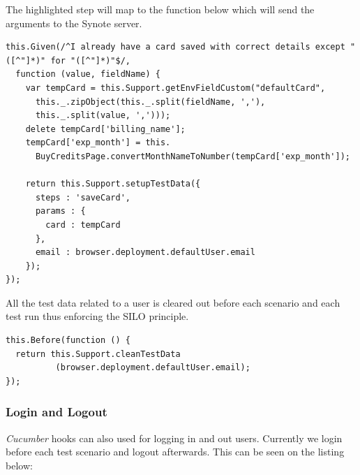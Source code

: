 The highlighted step will map to the function below which will send the arguments to the Synote server.

\begin{listing}[H]
\begin{verbatim}
this.Given(/^I already have a card saved with correct details except "([^"]*)" for "([^"]*)"$/,
  function (value, fieldName) {
    var tempCard = this.Support.getEnvFieldCustom("defaultCard",
      this._.zipObject(this._.split(fieldName, ','),
      this._.split(value, ',')));
    delete tempCard['billing_name'];
    tempCard['exp_month'] = this.
      BuyCreditsPage.convertMonthNameToNumber(tempCard['exp_month']);

    return this.Support.setupTestData({
      steps : 'saveCard',
      params : {
        card : tempCard
      },
      email : browser.deployment.defaultUser.email
    });
});
\end{verbatim}
\label{lst:data-insertion-step-function}
\end{listing}

All the test data related to a user is cleared out before each scenario and each test run thus enforcing the SILO principle.

\begin{listing}[H]
\begin{verbatim}
this.Before(function () {
  return this.Support.cleanTestData
          (browser.deployment.defaultUser.email);
});
\end{verbatim}
\label{lst:remove-test-data-before-scenario}
\end{listing}

\subsubsection{Login and Logout}
\label{subsubsec:login-and-logout}

\textit{Cucumber} hooks can also used for logging in and out users. Currently we login before each test scenario and logout afterwards. This can be seen on the listing below:

